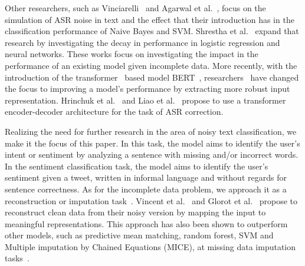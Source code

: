\documentclass[review]{elsarticle}
\begin{document}
Other researchers, such as Vinciarelli~\cite{vinciarelli2005noisy} and Agarwal et al.~\cite{agarwal2007much}, focus on the simulation of ASR noise in text and the effect that their introduction has in the classification performance of Naive Bayes and SVM. Shrestha et al.~\cite{shrestha2019using} expand that research by investigating the decay in performance in logistic regression and neural networks. These works focus on investigating the impact in the performance of an existing model given incomplete data. More recently, with the introduction of the transformer~\cite{vaswani2017attention} based model BERT~\cite{devlin2018bert}, researchers~\cite{hrinchuk2020correction,liao2020improving} have changed the focus to improving a model's performance by extracting more robust  input representation. Hrinchuk et al.~\cite{hrinchuk2020correction} and Liao et al.~\cite{liao2020improving} propose to use a transformer encoder-decoder architecture for the task of ASR correction.

Realizing the need for further research in the area of noisy text classification, we make it the focus of this paper. In this task, the model aims to identify the user's intent or sentiment by analyzing a sentence with missing and/or incorrect words. In the sentiment classification task, the model aims to identify the user's sentiment given a tweet, written in informal language and without regards for sentence correctness. As for the incomplete data problem, we approach it as a reconstruction or imputation task~\cite{pratama2016review}. Vincent et al.~\cite{vincent2008extracting,vincent2010stacked} and Glorot et al.~\cite{glorot2011deep} propose to reconstruct clean data from their noisy version by mapping the input to meaningful representations. This approach has also been shown to outperform other models, such as predictive mean matching, random forest, SVM and Multiple imputation by Chained Equations (MICE), at missing data imputation tasks~\cite{gondara2017multiple,costa2018missing}.
\end{document}
